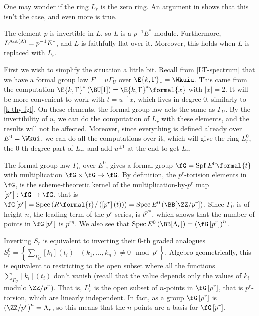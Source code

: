 One may wonder if the ring $L_r$ is the zero ring.
An argument in \cite{HKR} shows that this isn't the case, and even more is true.

\begin{proposition}\label{Lr-fixed-points}
	The element $p$ is invertible in $L$, so $L$ is a $p^{-1} E^*$-module.
	Furthermore, $L^{\operatorname{Aut} \left(\Lambda\right)} = p^{-1} E^*$, and $L$ is faithfully flat over it.
	Moreover, this holds when $L$ is replaced with $L_r$.
\end{proposition}

\begin{remark}\label{alg-geo-Lr}
	First we wish to simplify the situation a little bit.
	Recall from \ref{LT-spectrum} that we have a formal group law $F = u \Gamma_U$ over $\E{k, \Gamma}_* = \Wkuiu$.
	This came from the computation $\E{k, \Gamma}^*\left(\BU[1]\right) = \E{k, \Gamma}^* \formal{x}$ with $\left|x\right| = 2$.
	It will be more convenient to work with $t = u^{-1} x$, which lives in degree $0$, similarly to \ref{k-thy-fgl}.
	On these elements, the formal group law acts the same as $\Gamma_U$.
	By the invertibility of $u$, we can do the computation of $L_r$ with these elements, and the results will not be affected.
	Moreover, since everything is defined already over $E^0 = \Wkui$, we can do all the computations over it, which will give the ring $L_r^0$, the $0$-th degree part of $L_r$, and add $u^{\pm 1}$ at the end to get $L_r$.
	
	The formal group law $\Gamma_U$ over $E^0$, gives a formal group $\fG = \spf E^0\formal{t}$ with multiplication $\fG \times \fG \to \fG$.
	By definition, the $p^r$-torision elements in $\fG$, is the scheme-theoretic kernel of the multiplication-by-$p^r$ map $\left[p^r\right]: \fG \to \fG$, that is $\fG\left[p^r\right] = \spec\left(R\formal{t}/\left(\left[p^r\right]\left(t\right)\right)\right) = \spec E^0\left(\BB[\ZZ / p^r]\right)$.
	Since $\Gamma_U$ is of height $n$, the leading term of the $p^r$-series, is $t^{p^{rn}}$, which shows that the number of points in $\fG\left[p^r\right]$ is $p^{rn}$.
	We also see that $\spec E^0\left(\BB[\Lambda_r]\right) = \left(\fG\left[p^r\right]\right)^n$.
	
	Inverting $S_r$ is equivalent to inverting their $0$-th graded analogues $S_r^0 = \left\{ \sum_{\Gamma_U} [k_i]\left(t_i\right) \mid \left(k_1, \dotsc, k_n\right) \neq 0 \mod p^r\right\}$.
	Algebro-geometrically, this is equivalent to restricting to the open subset where all the functions $\sum_{\Gamma_U} [k_i]\left(t_i\right)$ don't vanish (recall that the value depends only the values of $k_i$ modulo $\ZZ/p^r$).
	That is, $L_r^0$ is the open subset of $n$-points in $\fG\left[p^r\right]$, that is $p^r$-torsion, which are linearly independent.
	In fact, as a group $\fG\left[p^r\right]$ is $\left(\ZZ/p^r\right)^n = \Lambda_r$, so this means that the $n$-points are a basis for $\fG\left[p^r\right]$.
	

\end{remark}
